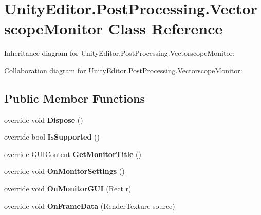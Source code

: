 \hypertarget{class_unity_editor_1_1_post_processing_1_1_vectorscope_monitor}{}\section{Unity\+Editor.\+Post\+Processing.\+Vectorscope\+Monitor Class Reference}
\label{class_unity_editor_1_1_post_processing_1_1_vectorscope_monitor}


Inheritance diagram for Unity\+Editor.\+Post\+Processing.\+Vectorscope\+Monitor\+:


Collaboration diagram for Unity\+Editor.\+Post\+Processing.\+Vectorscope\+Monitor\+:
\subsection*{Public Member Functions}
\begin{DoxyCompactItemize}
\item 
\mbox{\label{class_unity_editor_1_1_post_processing_1_1_vectorscope_monitor_a005eed06f524b178cf20c653a065e4b8}} 
override void {\bfseries Dispose} ()
\item 
\mbox{\label{class_unity_editor_1_1_post_processing_1_1_vectorscope_monitor_a463538bb61faf99a1507ac9501eb7de1}} 
override bool {\bfseries Is\+Supported} ()
\item 
\mbox{\label{class_unity_editor_1_1_post_processing_1_1_vectorscope_monitor_aaab4f236c863002855bf65f364e981ea}} 
override G\+U\+I\+Content {\bfseries Get\+Monitor\+Title} ()
\item 
\mbox{\label{class_unity_editor_1_1_post_processing_1_1_vectorscope_monitor_af640d93cb043401ba229796ac3803c1e}} 
override void {\bfseries On\+Monitor\+Settings} ()
\item 
\mbox{\label{class_unity_editor_1_1_post_processing_1_1_vectorscope_monitor_acb7862e8e86f2eb6cd33d8b2c89be22e}} 
override void {\bfseries On\+Monitor\+G\+UI} (Rect r)
\item 
\mbox{\label{class_unity_editor_1_1_post_processing_1_1_vectorscope_monitor_aad2a91361031b9b19ad81a7b72f9b695}} 
override void {\bfseries On\+Frame\+Data} (Render\+Texture source)
\end{DoxyCompactItemize}
